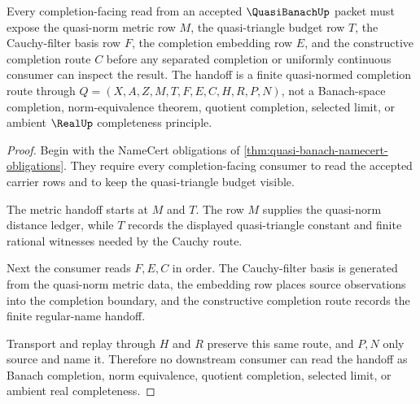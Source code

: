 \begin{theorem}
\label{thm:quasi-banach-metric-completion-handoff}
Every completion-facing read from an accepted $\QuasiBanachUp$ packet must expose the quasi-norm metric row $M$, the quasi-triangle budget row $T$, the Cauchy-filter basis row $F$, the completion embedding row $E$, and the constructive completion route $C$ before any separated completion or uniformly continuous consumer can inspect the result. The handoff is a finite quasi-normed completion route through $Q=(X,A,Z,M,T,F,E,C,H,R,P,N)$, not a Banach-space completion, norm-equivalence theorem, quotient completion, selected limit, or ambient $\RealUp$ completeness principle.
\end{theorem}
\begin{proof}
Begin with the NameCert obligations of \autoref{thm:quasi-banach-namecert-obligations}. They require every completion-facing consumer to read the accepted carrier rows and to keep the quasi-triangle budget visible.

The metric handoff starts at $M$ and $T$. The row $M$ supplies the quasi-norm distance ledger, while $T$ records the displayed quasi-triangle constant and finite rational witnesses needed by the Cauchy route.

Next the consumer reads $F,E,C$ in order. The Cauchy-filter basis is generated from the quasi-norm metric data, the embedding row places source observations into the completion boundary, and the constructive completion route records the finite regular-name handoff.

Transport and replay through $H$ and $R$ preserve this same route, and $P,N$ only source and name it. Therefore no downstream consumer can read the handoff as Banach completion, norm equivalence, quotient completion, selected limit, or ambient real completeness.
\end{proof}



